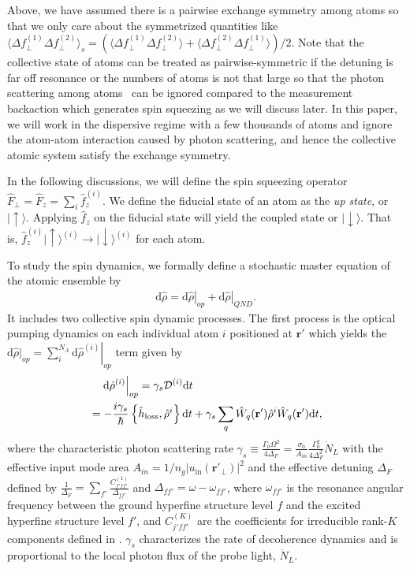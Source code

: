 \documentclass[preprint,aps,pra,onecolumn,superscriptaddress]{revtex4-1} %
\def\br{\mathbf{r}}
\def\ket#1{\lvert{#1}\rangle}%
\newcommand{\expect}[1]{\big\langle #1 \big\rangle}
\begin{document}
Above, we have assumed there is a pairwise exchange symmetry among atoms so that we only care about the symmetrized quantities like $ \expect{\Delta f_\perp^{(1)}\Delta f_\perp^{(2)}}_s=\left(\expect{\Delta f_\perp^{(1)}\Delta f_\perp^{(2)}} + \expect{\Delta f_\perp^{(2)}\Delta f_\perp^{(1)}} \right)/2 $. 
Note that the collective state of atoms can be treated as pairwise-symmetric if the detuning is far off resonance or the numbers of atoms is not that large so that the photon scattering among atoms~\cite{Asenjo-Garcia2017Atom,Asenjo-Garcia2017Exponential} can be ignored compared to the measurement backaction which generates spin squeezing as we will discuss later.
In this paper, we will work in the dispersive regime with a few thousands of atoms and ignore the atom-atom interaction caused by photon scattering, and hence the collective atomic system satisfy the exchange symmetry. 

In the following discussions, we will define the spin squeezing operator $ \hat{F}_\perp=\hat{F}_z=\sum_i\hat{f}_z^{(i)} $. 
We define the fiducial state of an atom as the \textit{up state}, or $ \ket{\uparrow} $. 
Applying $ \hat{f}_z $ on the fiducial state will yield the coupled state or $ \ket{\downarrow} $.
That is, $ \hat{f}_z^{(i)}\ket{\uparrow}^{(i)}\rightarrow \ket{\downarrow}^{(i)} $ for each atom.

To study the spin dynamics, we formally define a stochastic master equation of the atomic ensemble by
\begin{align}\label{eq:totaldrhodt}
\mathrm{d}\hat{\rho}=\left.\mathrm{d}\hat{\rho}\right|_{op} + \left.\mathrm{d}\hat{\rho}\right|_{QND}.
\end{align}
It includes two collective spin dynamic processes. 
The first process is the optical pumping dynamics on each individual atom $i$ positioned at $\br'$ which yields the $\mathrm{d}\hat{\rho}|_{op}=\sum_i^{N_A} \left.\mathrm{d}\hat{\rho}^{(i)}\right|_{op} $ term given by
\begin{align}
&\quad\left.\mathrm{d}\hat{\rho}^{(i)}\right|_{op} =\gamma_s\mathcal{D}^{(i)}\mathrm{d}t\\
&= -\frac{i\gamma_s}{\hbar} \left\{\hat{h}_{\rm loss},\hat{\rho}^{i} \right\}\mathrm{d}t + \gamma_s\sum_q \hat{W}_q(\br')\hat{\rho}^{i}\hat{W}_q(\br')\mathrm{d}t,
\end{align}
where the characteristic photon scattering rate $ \gamma_s\equiv \frac{\Gamma_0\Omega^2}{4\Delta_F}=\frac{\sigma_0}{A_{in}}\frac{\Gamma_0^2}{4\Delta_F^2}\dot{N}_L $ with the effective input mode area $ A_{in}=1/n_g|u_{\mathrm{in}}(\br'\!_\perp)|^2 $ and the effective detuning $ \Delta_F $ defined by $ \frac{1}{\Delta_F}=\sum_{f'}\frac{C_{f'ff'}^{(1)}}{\Delta_{ff'}} $ and $ \Delta_{ff'}=\omega-\omega_{ff'} $, where $ \omega_{ff'} $ is the resonance angular frequency between the ground hyperfine structure level $ f $ and the excited hyperfine structure level $ f' $, and $ C_{j'ff'}^{(K)} $ are the coefficients for irreducible rank-$K$ components defined in \cite{Deutsch2010a}.
$\gamma_s$ characterizes the rate of decoherence dynamics and is proportional to the local photon flux of the probe light, $ \dot{N}_L $.
\end{document}
